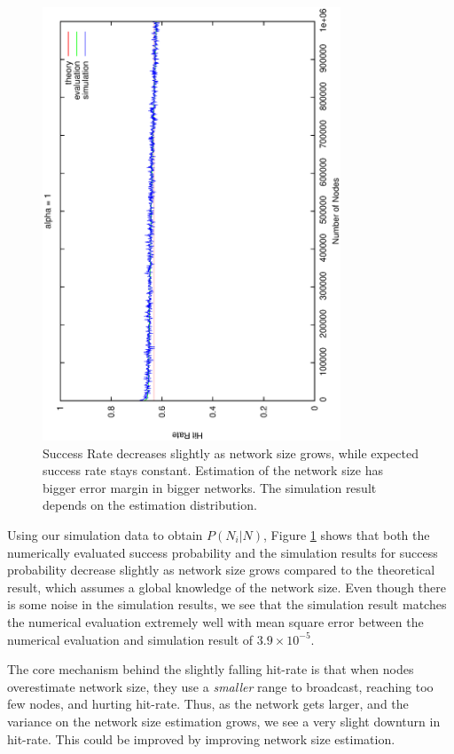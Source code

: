 \documentclass[9.5pt,journal,final,finalsubmission,twocolumn]{IEEEtran}
\begin{document}
\begin{figure}
\centering
\includegraphics[angle=270,width=3.5in]{evaluation}
\caption{Success Rate decreases slightly as network size grows, 
while expected success rate stays constant. 
Estimation of the network size has bigger error margin in bigger 
networks. The simulation result depends on the estimation distribution.} 
\label{fig:anal}
\end{figure}
Using our simulation data to obtain $P(N_i|N)$,
Figure \ref{fig:anal} shows that both the numerically evaluated success probability
and the simulation results for success probability decrease slightly 
as network size grows compared to the theoretical result, which assumes a global
knowledge of the network size. Even though there is some noise in the 
simulation results, we see that
the simulation result matches the numerical evaluation extremely well
with mean square error between the numerical evaluation and 
simulation result of $3.9\times 10^{-5}$.

The core mechanism behind the slightly falling hit-rate is that
when nodes overestimate network size, they use a \emph{smaller} range
to broadcast, reaching too few nodes, and hurting hit-rate.  Thus, as the
network gets larger, and the variance on the network size estimation grows,
we see a very slight downturn in hit-rate.  This could be improved by
improving network size estimation.
\end{document}
